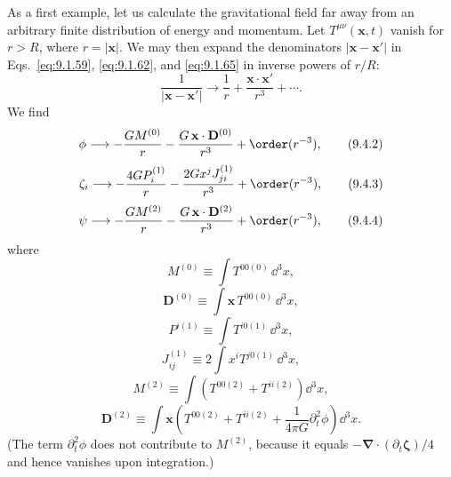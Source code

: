 As a first example, let us calculate the gravitational field far away from
an arbitrary finite distribution of energy and momentum. Let
\(T^{\mu\nu}(\mathbf x,t)\) vanish for \(r>R\), where
\(r=|\mathbf x|\). We may then expand the denominators
\(|\mathbf x-\mathbf x'|\) in Eqs.~\eqref{eq:9.1.59},
\eqref{eq:9.1.62}, and \eqref{eq:9.1.65} in inverse powers of \(r/R\):
\begin{equation}
  \frac1{|\mathbf x-\mathbf x'|}
  \longrightarrow
  \frac1r+\frac{\mathbf x\cdot\mathbf x'}{r^3}+\cdots.
  \tag{9.4.1}\label{eq:9.4.1}
\end{equation}
We find
\begin{equation}
  \phi
  \longrightarrow
  -\frac{G M^{(0)}}r
  -\frac{G\,\mathbf x\cdot\mathbf D^{(0)}}{r^3}
  +\order(r^{-3}),
  \tag{9.4.2}\label{eq:9.4.2}
\end{equation}
\begin{equation}
  \zeta_i
  \longrightarrow
  -\frac{4G P_i^{(1)}}r
  -\frac{2Gx^jJ_{ji}^{(1)}}{r^3}
  +\order(r^{-3}),
  \tag{9.4.3}\label{eq:9.4.3}
\end{equation}
\begin{equation}
  \psi
  \longrightarrow
  -\frac{G M^{(2)}}r
  -\frac{G\,\mathbf x\cdot\mathbf D^{(2)}}{r^3}
  +\order(r^{-3}),
  \tag{9.4.4}\label{eq:9.4.4}
\end{equation}
where
\begin{equation}
  M^{(0)}\equiv\int T^{00(0)}\,\dd^3x,
  \tag{9.4.5}\label{eq:9.4.5}
\end{equation}
\begin{equation}
  \mathbf D^{(0)}
  \equiv\int\mathbf x\,T^{00(0)}\,\dd^3x,
  \tag{9.4.6}\label{eq:9.4.6}
\end{equation}
\begin{equation}
  P^{i(1)}\equiv\int T^{i0(1)}\,\dd^3x,
  \tag{9.4.7}\label{eq:9.4.7}
\end{equation}
\begin{equation}
  J_{ij}^{(1)}
  \equiv2\int x^iT^{j0(1)}\,\dd^3x,
  \tag{9.4.8}\label{eq:9.4.8}
\end{equation}
\begin{equation}
  M^{(2)}
  \equiv\int\left(T^{00(2)}+T^{ii(2)}\right)\dd^3x,
  \tag{9.4.9}\label{eq:9.4.9}
\end{equation}
\begin{equation}
  \mathbf D^{(2)}
  \equiv
  \int\mathbf x
  \left(
    T^{00(2)}+T^{ii(2)}
    +\frac1{4\pi G}\partial_t^2\phi
  \right)\dd^3x.
  \tag{9.4.10}\label{eq:9.4.10}
\end{equation}
(The term \(\partial_t^2\phi\) does not contribute to \(M^{(2)}\),
because it equals \(-\boldsymbol\nabla\cdot(\partial_t\boldsymbol\zeta)/4\)
and hence vanishes upon integration.)

